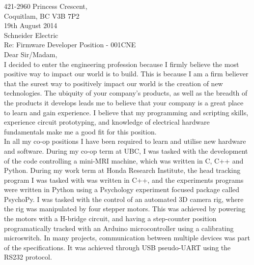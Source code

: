 \documentclass[10pt,a4paper]{article}
\begin{document}
\flushleft
\large
421-2960 Princess Crescent,\\
Coquitlam, BC V3B 7P2 \\
\medskip
19th August 2014 \\
\medskip
Schneider Electric\\
\medskip
Re: Firmware Developer Position - 001CNE\\
\medskip
Dear Sir/Madam,\\

\medskip
\hspace{10mm}
I decided to enter the engineering profession because I firmly believe the most positive way to impact our world is to build.
This is because I am a firm believer that the surest way to positively impact our world is the creation of new technologies.
	The ubiquity of your company's products, as well as the breadth of the products it develops leads me to believe that your company is a great
	place to learn and gain experience. 
I believe that my 
	programming and scripting skills, experience circuit prototyping, and knowledge of electrical hardware fundamentals 
make me a good fit for this position.
\\
\medskip
\hspace{10mm}
In all my co-op positions I have been required to learn and utilise new hardware and software.
During my co-op term at UBC, I was tasked with the development of the code controlling a mini-MRI machine, which was written in C, C++ and Python.
During my work term at Honda Research Institute, the head tracking program I was tasked with was written in C++, and the experiments programs were
written in Python using a Psychology experiment focused package called PsychoPy.
I was tasked with the control of an automated 3D camera rig, where the rig was manipulated by four stepper motors.
This was achieved by powering the motors with a H-bridge circuit, and having a step-counter position programatically tracked with an Arduino 
microcontroller using a calibrating microswitch.
In many projects, communication between multiple devices was part of the specifications. 
It was achieved through USB pseudo-UART using the RS232 protocol.
\end{document}
